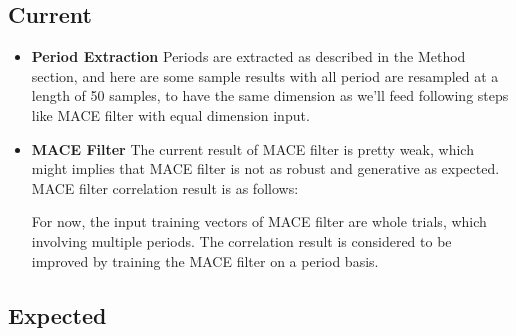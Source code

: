 \documentclass[10pt,twocolumn,letterpaper]{article}
\begin{document}
\subsection{Current}
    \begin{itemize}
    \item \textbf{Period Extraction}\newline
    Periods are extracted as described in the Method section, and here are some sample results with all period are resampled at a length of 50 samples, to have the same dimension as we’ll feed following steps like MACE filter with equal dimension input.

\begin{figure}[t]
\begin{center}
\fbox{\rule{0pt}{2in} \rule{0.9\linewidth}{0pt}}
   \caption{}
\end{center}
\end{figure}

\begin{figure}[t]
\begin{center}
\fbox{\rule{0pt}{2in} \rule{0.9\linewidth}{0pt}}
   \caption{}
\end{center}
\end{figure}
\item \textbf{MACE Filter}\newline
The current result of MACE filter is pretty weak, which might implies that MACE filter is not as robust and generative as expected. MACE filter correlation result is as follows:

\begin{figure}[t]
\begin{center}
\fbox{\rule{0pt}{2in} \rule{0.9\linewidth}{0pt}}
   \caption{}
\end{center}
\end{figure}

For now, the input training vectors of MACE filter are whole trials, which involving multiple periods. The correlation result is considered to be improved by training the MACE filter on a period basis.
    \end{itemize}

\subsection{Expected}
\end{document}
